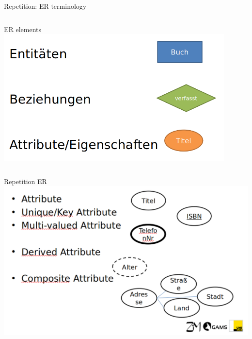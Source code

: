 \begin{frame}{Repetition: ER terminology~\parencite[9--12]{chen1976}}
\begin{columns}[T,onlytextwidth]
      \begin{block}{ER elements}
      \includegraphics[width=0.9\textwidth]{img/er-bsp2.png}
      \end{block}
  \end{columns}

\end{frame}

\begin{frame}{Repetition ER}
    \includegraphics[width=\textwidth]{img/wdh-er-bestandteile.png}
\end{frame}


